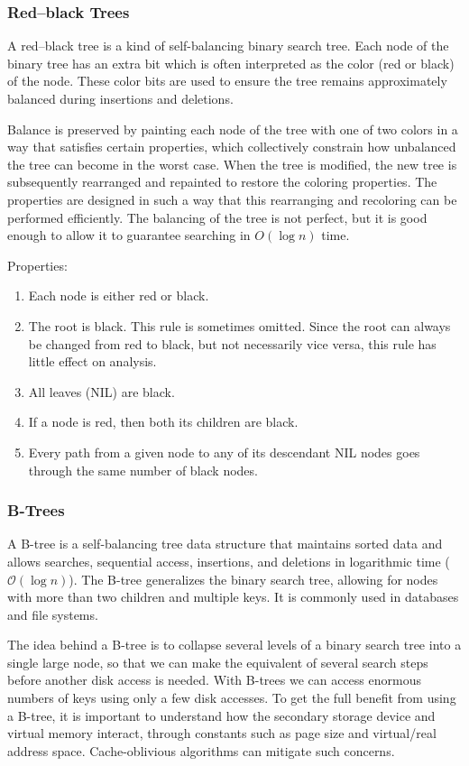 \documentclass{article}
\newcommand{\bigO}{\mathcal{O}}
\begin{document}
    \subsubsection{Red–black Trees}
    A red–black tree is a kind of self-balancing binary search tree. Each node of the binary tree has an extra bit which is often interpreted as the color (red or black) of the node. These color bits are used to ensure the tree remains approximately balanced during insertions and deletions.
    
    Balance is preserved by painting each node of the tree with one of two colors in a way that satisfies certain properties, which collectively constrain how unbalanced the tree can become in the worst case. When the tree is modified, the new tree is subsequently rearranged and repainted to restore the coloring properties. The properties are designed in such a way that this rearranging and recoloring can be performed efficiently. The balancing of the tree is not perfect, but it is good enough to allow it to guarantee searching in $O(\log n)$ time.
    
    Properties:
    \begin{enumerate}
        \item Each node is either red or black.
        \item The root is black. This rule is sometimes omitted. Since the root can always be changed from red to black, but not necessarily vice versa, this rule has little effect on analysis.
        \item All leaves (NIL) are black.
        \item If a node is red, then both its children are black.
        \item Every path from a given node to any of its descendant NIL nodes goes through the same number of black nodes.
    \end{enumerate}
    
    \subsubsection{B-Trees}
    A B-tree is a self-balancing tree data structure that maintains sorted data and allows searches, sequential access, insertions, and deletions in logarithmic time ($\bigO(\log n)$). The B-tree generalizes the binary search tree, allowing for nodes with more than two children and multiple keys. It is commonly used in databases and file systems.
    
    The idea behind a B-tree is to collapse several levels of a binary search tree into a single large node, so that we can make the equivalent of several search steps before another disk access is needed. With B-trees we can access enormous numbers of keys using only a few disk accesses. To get the full benefit from using a B-tree, it is important to understand how the secondary storage device and virtual memory interact, through constants such as page size and virtual/real address space. Cache-oblivious algorithms can mitigate such concerns.
    
\end{document}
